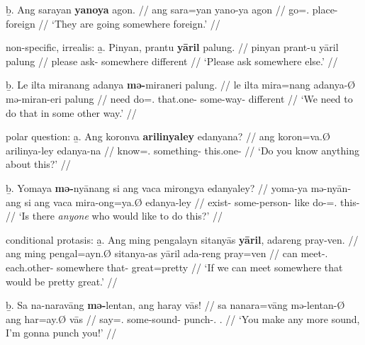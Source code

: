 	\b{b.} \begingl
		\gla Ang sarayan \textbf{yanoya} agon. //
		\glb ang sara=yan yano-ya agon //
		\glc \AgtT{} go=\TplM{}.\Top{} place-\Loc{} foreign //
		\glft `They are going somewhere foreign.' //
		\endgl
	\endsubsub

\a non-specific, irrealis:\vspace{.5em} %
	\beginsubsub
	\b{a.} \begingl
		\gla Pinyan, prantu \textbf{yāril} palung. //
		\glb pinyan prant-u yāril palung //
		\glc please ask-\Imp{} somewhere different //
		\glft `Please ask somewhere else.' //
		\endgl\vspace{.5em}
		
	\b{b.} \begingl
		\gla Le ilta miranang adanya \textbf{mə-}miraneri 
			palung. //
		\glb le ilta mira=nang adanya-Ø mə-miran-eri palung //
		\glc \PatTI{} need do=\Fsg{}.\Aarg{} that.one-\Top{} 
			some-way-\Ins{} different //
		\glft `We need to do that in some other way.' //
		\endgl
	\endsubsub

\a polar question:\vspace{.5em} %
	\beginsubsub
	\b{a.} \begingl
		\gla Ang koronva \textbf{arilinyaley} edanyana? //
		\glb ang koron=va.Ø arilinya-ley edanya-na //
		\glc \AgtT{} know=\Ssg{}.\Top{} something-\PargI{} 
			this.one-\Gen{} //
		\glft `Do you know anything about this?' //
		\endgl\vspace{.5em}
		
	\b{b.} \begingl
		\gla Yomaya \textbf{mə-}nyānang si ang vaca mirongya 
			edanyaley? //
		\glb yoma-ya mə-nyān-ang si ang vaca mira-ong=ya.Ø
			edanya-ley //
		\glc exist-\TsgM{} some-person-\Aarg{} \Rel{} \AgtT{} 
			like do-\Irr{}=\TsgM{}.\Top{} this-\PargI{} //
		\glft `Is there \emph{anyone} who would like to do this?' //
		\endgl
	\endsubsub

\a conditional protasis:\vspace{.5em} %
	\beginsubsub
	\b{a.} \begingl
		\gla Ang ming pengalayn sitanyās \textbf{yāril}, adareng 
			pray-ven. //
		\glb ang ming pengal=ayn.Ø sitanya-as yāril ada-reng 
			pray=ven //
		\glc \AgtT{} can meet-\Fpl{}.\Top{} each.other-\Parg{} 
			somewhere that-\AargI{} great=pretty //
		\glft `If we can meet somewhere that would be pretty great.' //
		\endgl\vspace{.5em}
		
	\b{b.} \begingl
		\gla Sa na-naravāng \textbf{mə-}lentan, ang haray vās! //
		\glb sa na\til{}nara=vāng mə-lentan-Ø ang har=ay.Ø vās //
		\glc \PatT{} \Iter{}\til{}say=\Ssg{}.\Aarg{} some-sound-\Top{} 
			\AgtT{} punch-\Fsg{}.\Top{} \Ssg{}.\Parg{} //
		\glft `You make any more sound, I'm gonna punch you!' //
		\endgl
	\endsubsub

